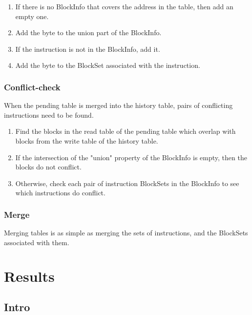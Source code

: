 \documentclass[12pt,twoside]{reedthesis}
\begin{document}
			\begin{enumerate}
				\item If there is no BlockInfo that covers the address in the table, then add an empty one.
				\item Add the byte to the union part of the BlockInfo.
				\item If the instruction is not in the BlockInfo, add it.
				\item Add the byte to the BlockSet associated with the instruction.
			\end{enumerate}
			
			
			\subsection{Conflict-check}
			
			When the pending table is merged into the history table, pairs of conflicting instructions need to be found. 
			
			\begin{enumerate}
				\item Find the blocks in the read table of the pending table which overlap with blocks from the write table of the history table. 
				\item If the intersection of the "union" property of the BlockInfo is empty, then the blocks do not conflict.
				\item Otherwise, check each pair of instruction BlockSets in the BlockInfo to see which instructions do conflict. 
			\end{enumerate}
			
			
			\subsection{Merge}
			
			Merging tables is as simple as merging the sets of instructions, and the BlockSets associated with them. 
			
			
\chapter{Results}
	
		\section{Intro}
	
\end{document}
